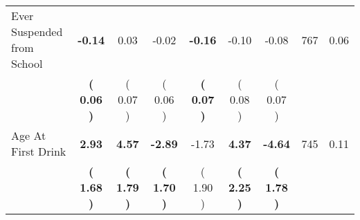 \begin{tabular}{lcccccccc}
Ever Suspended from School & \textbf{    -0.14} &      0.03 &     -0.02 & \textbf{    -0.16} &     -0.10 &     -0.08 & 767 &       0.06 \\ 
 & \textbf{(     0.06 )} & (     0.07 ) & (     0.06 ) & \textbf{(     0.07 )} & (     0.08 ) & (     0.07 ) & \\
Age At First Drink & \textbf{     2.93} & \textbf{     4.57} & \textbf{    -2.89} &     -1.73 & \textbf{     4.37} & \textbf{    -4.64} & 745 &       0.11 \\ 
 & \textbf{(     1.68 )} & \textbf{(     1.79 )} & \textbf{(     1.70 )} & (     1.90 ) & \textbf{(     2.25 )} & \textbf{(     1.78 )} & \\
\bottomrule
\end{tabular}
